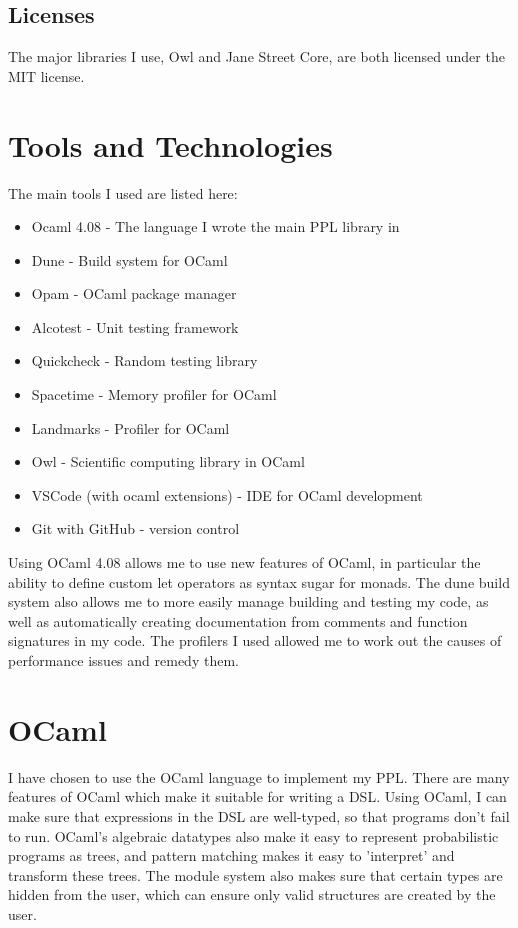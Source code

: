 \subsection{Licenses}

The major libraries I use, Owl and Jane Street Core, are both licensed under the MIT license.

\section{Tools and Technologies}
The main tools I used are listed here:
\begin{itemize}
	\item Ocaml 4.08 - The language I wrote the main PPL library in
	\item Dune - Build system for OCaml
	\item Opam - OCaml package manager
	\item Alcotest - Unit testing framework
	\item Quickcheck - Random testing library
	\item Spacetime - Memory profiler for OCaml
	\item Landmarks - Profiler for OCaml
	\item Owl - Scientific computing library in OCaml
	\item VSCode (with ocaml extensions) - IDE for OCaml development
	\item Git with GitHub - version control
\end{itemize}

Using OCaml 4.08 allows me to use new features of OCaml, in particular the ability to define custom let operators as syntax sugar for monads. The dune build system also allows me to more easily manage building and testing my code, as well as automatically creating documentation from comments and function signatures in my code. The profilers I used allowed me to work out the causes of performance issues and remedy them. 

\section{OCaml}
I have chosen to use the OCaml language to implement my PPL. There are many features of OCaml which make it suitable for writing a DSL. Using OCaml, I can make sure that expressions in the DSL are well-typed, so that programs don't fail to run. OCaml's algebraic datatypes also make it easy to represent probabilistic programs as trees, and pattern matching makes it easy to 'interpret' and transform these trees. The module system also makes sure that certain types are hidden from the user, which can ensure only valid structures are created by the user.

